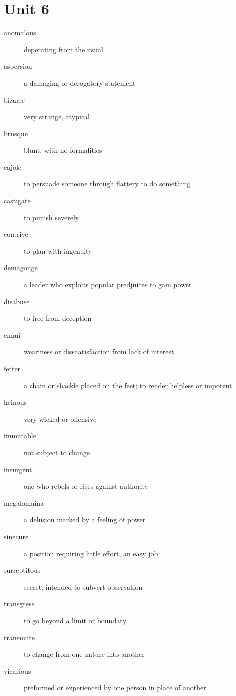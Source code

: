 \section{Unit 6}
\begin{description}
  \item[anomalous] deperating from the usual
  \item[aspersion] a damaging or derogatory statement
  \item[bizarre] very strange, atypical
  \item[brusque] blunt, with no formalities
  \item[cajole] to persuade someone through flattery to do something
  \item[castigate] to punish severely
  \item[contrive] to plan with ingenuity
  \item[demagouge] a leader who exploits popular predjuices to gain power
  \item[disabuse] to free from deception
  \item[ennui] weariness or dissaatisfaction from lack of interest
  \item[fetter] a chain or shackle placed on the feet; to render helpless or
    impotent
  \item[heinous] very wicked or offensive
  \item[immutable] not subject to change
  \item[insurgent] one who rebels or rises against authority
  \item[megalomaina] a delusion marked by a feeling of power
  \item[sinecure] a position requiring little effort, an easy job
  \item[surreptitous] secret, intended to subvert observation
  \item[transgress] to go beyond a limit or boundary
  \item[transmute] to change from one nature into another
  \item[vicarious] preformed or experienced by one person in place of another
\end{description}

